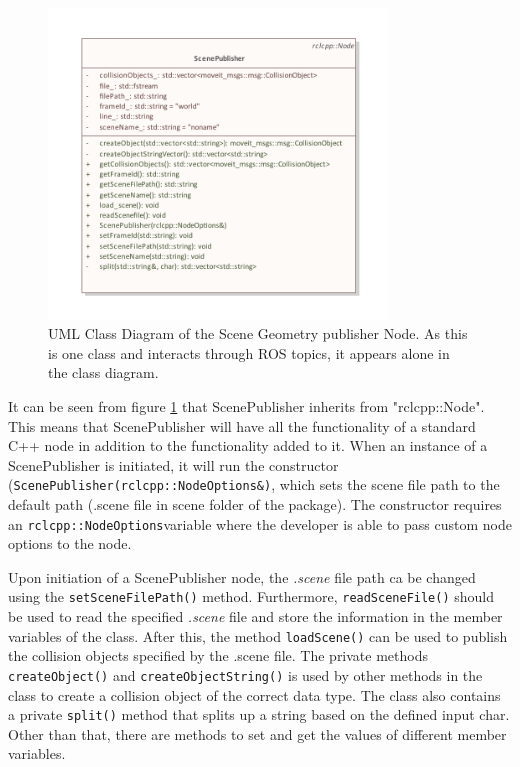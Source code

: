 \begin{figure}[htp]
  \centering
  \includegraphics[width = 0.8\textwidth]{Figures/scene_geometry_publisher.pdf}
  \caption{UML Class Diagram of the Scene Geometry publisher Node. As this is one class and interacts through ROS topics, it appears alone in the class diagram.}
  \label{fig:scenePublisherUML}
\end{figure}

It can be seen from figure \ref{fig:scenePublisherUML} that ScenePublisher inherits from "rclcpp::Node". This means that ScenePublisher will have all the functionality of a standard C++ node in addition to the functionality added to it. When an instance of a ScenePublisher is initiated, it will run the constructor (\lstinline{ScenePublisher(rclcpp::NodeOptions&)}, which sets the scene file path to the default path (.scene file in scene folder of the package). The constructor requires an \lstinline{rclcpp::NodeOptions}variable where the developer is able to pass custom node options to the node. 

Upon initiation of a ScenePublisher node, the \textit{.scene} file path ca be changed using the \lstinline{setSceneFilePath()} method. Furthermore, \lstinline{readSceneFile()} should be used to read the specified \textit{.scene} file and store the information in the member variables of the class. After this, the method \lstinline{loadScene()} can be used to publish the collision objects specified by the .scene file. The private methods \lstinline{createObject()} and \lstinline{createObjectString()} is used by other methods in the class to create a collision object of the correct data type. The class also contains a private \lstinline{split()} method that splits up a string based on the defined input char. Other than that, there are methods to set and get the values of different member variables.

